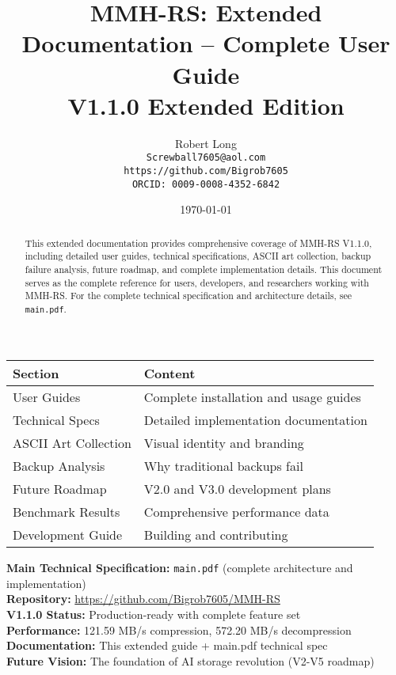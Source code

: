 \documentclass[11pt,a4paper]{article}
\title{MMH-RS: Extended Documentation -- Complete User Guide\\[1ex]\textbf{\large V1.1.0 Extended Edition}}
\author{Robert Long \\ \texttt{Screwball7605@aol.com} \\ \texttt{https://github.com/Bigrob7605} \\ \texttt{ORCID: 0009-0008-4352-6842}}
\date{\today}
\begin{document}
	\maketitle
	\thispagestyle{empty}
	\begin{abstract}
		This extended documentation provides comprehensive coverage of MMH-RS V1.1.0, including detailed user guides, technical specifications, ASCII art collection, backup failure analysis, future roadmap, and complete implementation details. This document serves as the complete reference for users, developers, and researchers working with MMH-RS. For the complete technical specification and architecture details, see \texttt{main.pdf}.
	\end{abstract}

	\begin{center}
	\begin{tcolorbox}[colback=gray!5, colframe=gray!60, boxrule=0.7pt, arc=2pt, title=\textbf{\large MMH-RS Extended Documentation Contents}]
	\begin{tabular}{@{}ll@{}}
	\toprule
	\textbf{Section} & \textbf{Content} \\
	\midrule
	User Guides & Complete installation and usage guides \\
	Technical Specs & Detailed implementation documentation \\
	ASCII Art Collection & Visual identity and branding \\
	Backup Analysis & Why traditional backups fail \\
	Future Roadmap & V2.0 and V3.0 development plans \\
	Benchmark Results & Comprehensive performance data \\
	Development Guide & Building and contributing \\
	\bottomrule
	\end{tabular}
	\end{tcolorbox}
	\end{center}

	\begin{calloutbox}
	\textbf{Main Technical Specification:} \texttt{main.pdf} (complete architecture and implementation) \\
	\textbf{Repository:} \url{https://github.com/Bigrob7605/MMH-RS} \\
	\textbf{V1.1.0 Status:} Production-ready with complete feature set \\
	\textbf{Performance:} 121.59 MB/s compression, 572.20 MB/s decompression \\
	\textbf{Documentation:} This extended guide + main.pdf technical spec \\
	\textbf{Future Vision:} The foundation of AI storage revolution (V2-V5 roadmap)
	\end{calloutbox}
	
\end{document}
